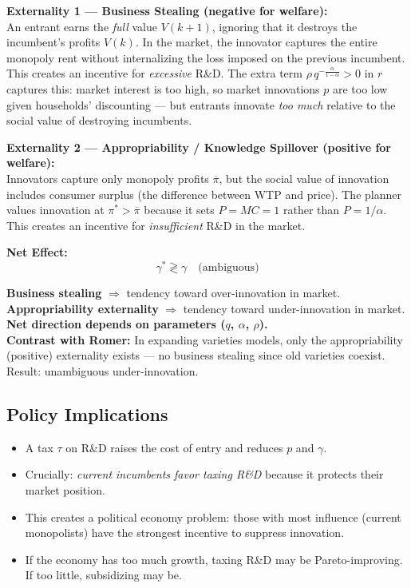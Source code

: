 \documentclass[a4paper,11pt]{article}
\newcommand{\pibar}{\overline{\pi}}
\begin{document}
\begin{derivationbox}[title={Two Externalities Driving the Wedge}]
\textbf{Externality 1 — Business Stealing (negative for welfare):}\\
An entrant earns the \emph{full} value $V(k+1)$, ignoring that it destroys the incumbent's profits $V(k)$.
In the market, the innovator captures the entire monopoly rent without internalizing the loss imposed on the previous incumbent. This creates an incentive for \emph{excessive} R\&D.
The extra term $\rho\, q^{-\frac{\alpha}{1-\alpha}} > 0$ in $r$ captures this: market interest is too high, so market innovations $p$ are too low given households' discounting --- but entrants innovate \emph{too much} relative to the social value of destroying incumbents.

\textbf{Externality 2 — Appropriability / Knowledge Spillover (positive for welfare):}\\
Innovators capture only monopoly profits $\pibar$, but the social value of innovation includes consumer surplus (the difference between WTP and price). The planner values innovation at $\pi^* > \pibar$ because it sets $P = MC = 1$ rather than $P = 1/\alpha$.
This creates an incentive for \emph{insufficient} R\&D in the market.

\textbf{Net Effect:}
\[
\gamma^* \gtrless \gamma \quad \text{(ambiguous)}
\]
\end{derivationbox}

\begin{resultbox}
\textbf{Business stealing} $\Rightarrow$ tendency toward over-innovation in market.\\
\textbf{Appropriability externality} $\Rightarrow$ tendency toward under-innovation in market.\\
\textbf{Net direction depends on parameters ($q$, $\alpha$, $\rho$).}\\[0.3em]
\textbf{Contrast with Romer:} In expanding varieties models, only the appropriability (positive) externality exists --- no business stealing since old varieties coexist. Result: unambiguous under-innovation.
\end{resultbox}

\subsection*{Policy Implications}

\begin{itemize}
    \item A tax $\tau$ on R\&D raises the cost of entry and reduces $p$ and $\gamma$.
    \item Crucially: \emph{current incumbents favor taxing R\&D} because it protects their market position.
    \item This creates a political economy problem: those with most influence (current monopolists) have the strongest incentive to suppress innovation.
    \item If the economy has too much growth, taxing R\&D may be Pareto-improving. If too little, subsidizing may be.
\end{itemize}
\end{document}
